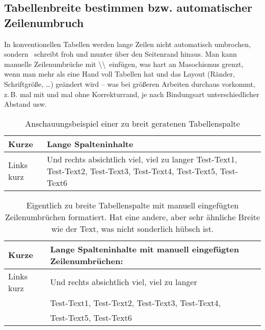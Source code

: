 \subsection{Tabellenbreite bestimmen bzw. automatischer Zeilenumbruch}

In konventionellen Tabellen werden lange Zeilen nicht automatisch umbrochen, sondern \DMLLaTeX \ schreibt froh und munter über den Seitenrand hinaus. Man kann manuelle Zeilenumbrüche mit \textbackslash \textbackslash \ einfügen, was hart an Masochismus grenzt, wenn man mehr als eine Hand voll Tabellen hat und das Layout (Ränder, Schriftgröße, \ldots) geändert wird -- was bei größeren Arbeiten durchaus vorkommt, z.\,B. mal mit und mal ohne Korrekturrand, je nach Bindungsart unterschiedlicher Abstand usw.

\begin{table}[h]	
		\begin{tabular}{| l | l |}  
			\hline
			Kurze				& Lange Spalteninhalte\\
			\hline
			Links kurz	&Und rechts absichtlich viel, viel zu langer Test-Text1, Test-Text2, Test-Text3, Test-Text4, Test-Text5, Test-Text6\\
			\hline			
		\end{tabular}
	\caption{Anschauungsbeispiel einer zu breit geratenen Tabellenspalte}
	\label{tab:Tabelle_zu_breit}
\end{table}

\begin{table}[h]	
		\begin{tabular}{| l | l |}  
			\hline
			Kurze				& Lange Spalteninhalte mit manuell eingefügten Zeilenumbrüchen:\\
			\hline
			Links kurz	&Und rechts absichtlich viel, viel zu langer\\
									&Test-Text1, Test-Text2, Test-Text3, Test-Text4,\\
									&Test-Text5, Test-Text6\\
			\hline						
		\end{tabular}
	\caption{Eigentlich zu breite Tabellenspalte mit manuell eingefügten Zeilenumbrüchen formatiert. Hat eine andere, aber sehr ähnliche Breite wie der Text, was nicht sonderlich hübsch ist.}
	\label{tab:Tabelle_zu_breit_manuell}
\end{table}

